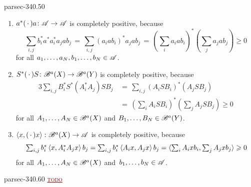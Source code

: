 \documentclass[b5page]{book}
\newcommand{\TODO}[1]{\textcolor{darkred}{\textsc{\underline{todo}}}}
\begin{document}
\begin{solution}{parsec-340.50}%
\begin{enumerate}
\item
$a^*(\,\cdot\,)a\colon \scrA\to\scrA$
is completely positive,
because $$\textstyle \sum_{i,j} b_i^* a^* a_i^* a_j a b_j
\,=\, \sum_{i,j} (a_iab_i)^*a_j a b_j
\,=\, (\sum_i a_iab_i)^*(\sum_j a_jab_j)\geq 0$$
for all $a_1,\dotsc,a_N,b_1,\dotsc,b_N\in \scrA$.
\item
$S^*(\,\cdot\,)S\colon \scrB^a(X)\to\scrB^a(Y)$
is completely positive,
because
\begin{alignat*}{3}
\textstyle
\sum_{i,j} B_i^* S^*(A_i^* A_j) S B_j
\,&\textstyle{}=\, \sum_{i,j} (A_i S B_i)^* (A_j S B_j)\\
\textstyle
\,&\textstyle{}=\, (\sum_i A_i S B_i)^* (\sum_j A_j S B_j)\geq 0
\end{alignat*}
for all $A_1,\dotsc,A_N\in \scrB^a(X)$
and $B_1,\dotsc,B_N\in \scrB^a(Y)$.
\item
$\left<x,(\,\cdot\,)x\right>\colon \scrB^a(X)\to\scrA$
is completely positive,
because
$$
\textstyle{}\sum_{i,j} b_i^*\left<x,A_i^* A_j x\right>b_j
=\sum_{i,j} b_i^*\left<A_i x , A_j x\right> b_j
= \left<\smash{\sum_i A_i x b_i,\sum_j A_j x b_j}\right> \geq 0$$
for all $A_1,\dotsc,A_N \in \scrB^a(X)$
and~$b_1,\dotsc, b_N\in \scrA$.
\end{enumerate}
\end{solution}
\begin{solution}{parsec-340.60}%
\TODO{}
\end{solution}
\end{document}
